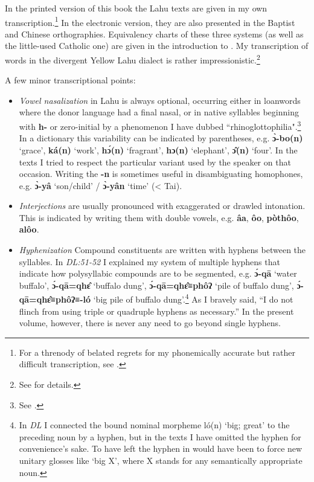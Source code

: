 In the printed version of this book the Lahu texts are given in my own
transcription.\footnote{For a threnody of belated regrets for my
  phonemically accurate but rather difficult transcription, see
  \citet{matisoff2014}.} In the electronic version, they are also presented
in the Baptist and Chinese orthographies. Equivalency charts of these
three systems (as well as the little-used Catholic one) are given in
the introduction to \citet[pp.14-28]{88}. My transcription of words in
the divergent Yellow Lahu dialect is rather
impressionistic.\footnote{See \citet{matisoff1969lahu} for details.}

A few minor transcriptional points:

\begin{itemize}

\item
  \emph{Vowel nasalization} in Lahu is always optional, occurring
  either in loanwords where the donor language had a final nasal, or
  in native syllables beginning with \textbf{h-} or zero-initial by a
  phenomenon I have dubbed ``rhinoglottophilia".\footnote{See
    \citet{m75}.} In a dictionary this variability can be indicated by
  parentheses, e.g. \textbf{ɔ̀-bo(n)} `grace', \textbf{ká(n) }`work',
  \textbf{hɔ́(n) }`fragrant', \textbf{hɔ(n) }`elephant', \textbf{ɔ̂(n)}
    `four'. In the texts I tried to respect the particular variant
  used by the speaker on that occasion. Writing the \textbf{-n} is
  sometimes useful in disambiguating homophones, e.g. \textbf{ɔ̀-yâ}
  `son/child' / \textbf{ɔ̀-yân} `time' (\textless{} Tai).

\item
  \emph{Interjections }are usually pronounced with exaggerated or
  drawled intonation. This is indicated by writing them with double
  vowels, e.g.  \textbf{âa}, \textbf{ôo}, \textbf{pòthôo},\textbf{
    alôo}.

\item
  \emph{Hyphenization} Compound constituents are written with
  hyphens between the syllables. In \emph{DL:51-52} I explained my
  system of multiple hyphens that indicate how polysyllabic compounds
  are to be segmented, e.g. \textbf{ɔ́-qā} `water buffalo',
  \textbf{ɔ́-qā=qhɛ̂} `buffalo dung', \textbf{ɔ́-qā=qhɛ̂≡phôʔ} `pile of
  buffalo dung', \textbf{ɔ́-qā=qhɛ̂≡phôʔ≡-ló} `big pile of buffalo
  dung'.\footnote{In \emph{DL} I connected the bound nominal morpheme
    ló(n) `big; great' to the preceding noun by a hyphen, but in the
    texts I have omitted the hyphen for convenience's sake. To have
    left the hyphen in would have been to force new unitary glosses
    like `big X', where X stands for any semantically appropriate
    noun.} As I bravely said, ``I do not flinch from using triple or
  quadruple hyphens as necessary.'' In the present volume, however,
  there is never any need to go beyond single hyphens.

\end{itemize}

